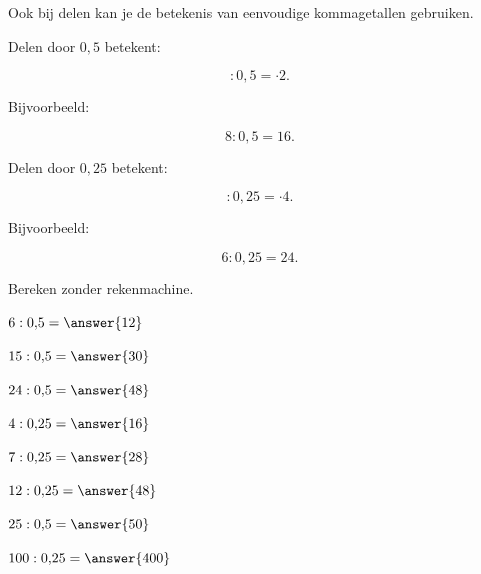 \documentclass{ximera}
\begin{document}

Ook bij delen kan je de betekenis van eenvoudige kommagetallen gebruiken.

Delen door \(0{,}5\) betekent:

\[
:0{,}5 = \cdot2.
\]

Bijvoorbeeld:

\[
8:0{,}5=16.
\]

Delen door \(0{,}25\) betekent:

\[
:0{,}25 = \cdot4.
\]

Bijvoorbeeld:

\[
6:0{,}25=24.
\]


\begin{oefening}{\oefB}

Bereken zonder rekenmachine.

\begin{question} \(6:0{,}5=\answer{12}\) \end{question}

\begin{question} \(15:0{,}5=\answer{30}\) \end{question}

\begin{question} \(24:0{,}5=\answer{48}\) \end{question}

\begin{question} \(4:0{,}25=\answer{16}\) \end{question}

\begin{question} \(7:0{,}25=\answer{28}\) \end{question}

\begin{question} \(12:0{,}25=\answer{48}\) \end{question}

\begin{question} \(25:0{,}5=\answer{50}\) \end{question}

\begin{question} \(100:0{,}25=\answer{400}\) \end{question}

\end{oefening}


\end{document}
